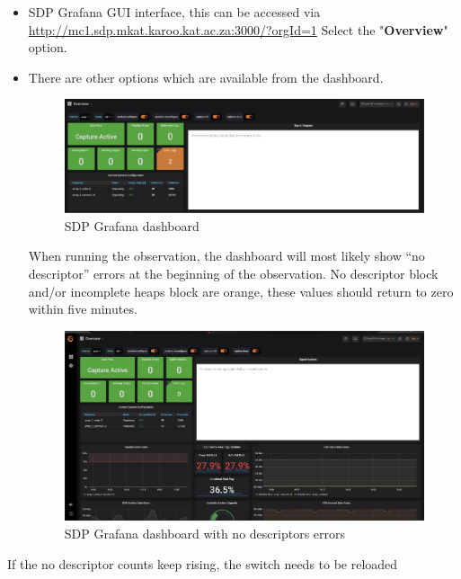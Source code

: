 \begin{itemize}
\item SDP Grafana GUI interface, this can be accessed via 	\url{http://mc1.sdp.mkat.karoo.kat.ac.za:3000/?orgId=1}  Select the "\textbf{Overview}" option. 

\item There are other options which are available from the dashboard.

\begin{figure}[H]
	\centering
	\includegraphics[scale=0.24]{Chapters/images/image11.png}
	
	\caption{SDP Grafana dashboard}
	\label{fig:image11}
\end{figure}


When running the observation, the dashboard will most likely show “no descriptor” errors at the beginning of the observation.  No descriptor block and/or incomplete heaps block are orange, these values should return to zero within five minutes.

\begin{figure}[!thb]
	\centering
	\includegraphics[scale=0.26]{Chapters/images/image15.png}
	
	\caption{SDP Grafana dashboard with no descriptors errors}
	\label{fig:image15}
\end{figure}
\end{itemize}
If the no descriptor counts keep rising, the switch needs to be reloaded

